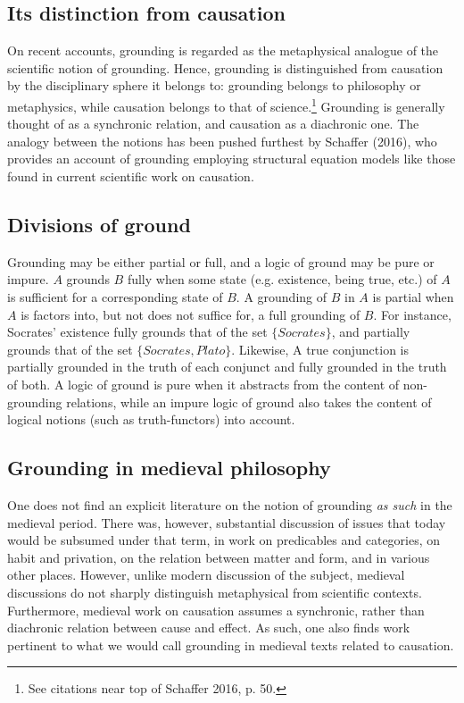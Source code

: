 \documentclass[a4paper,11pt]{article}
\begin{document}
\subsection{Its distinction from causation}
On recent accounts, grounding is regarded as the metaphysical analogue of the scientific notion of grounding. Hence, grounding is distinguished from causation by the disciplinary sphere it belongs to: grounding belongs to philosophy or metaphysics, while causation belongs to that of science.\footnote{See citations near top of Schaffer 2016, p. 50.} Grounding is generally thought of as a synchronic relation, and causation as a diachronic one. The analogy between the notions has been pushed furthest by Schaffer (2016), who provides an account of grounding employing structural equation models like those found in current scientific work on causation.
\subsection{Divisions of ground}
Grounding may be either partial or full, and a logic of ground may be pure or impure. $A$ grounds $B$ fully when some state (e.g. existence, being true, etc.) of $A$ is sufficient for a corresponding state of $B$. A grounding of $B$ in $A$ is partial when $A$ is factors into, but not does not suffice for, a full grounding of $B$. For instance, Socrates' existence fully grounds that of the set $\{Socrates\}$, and partially grounds that of the set $\{Socrates, Plato\}$. Likewise, A true conjunction is partially grounded in the truth of each conjunct and fully grounded in the truth of both. A logic of ground is pure when it abstracts from the content of non-grounding relations, while an impure logic of ground also takes the content of logical notions (such as truth-functors) into account.

\subsection{Grounding in medieval philosophy}
One does not find an explicit literature on the notion of grounding \textit{as such} in the medieval period. There was, however, substantial discussion of issues that today would be subsumed under that term, in work on predicables and categories, on habit and privation, on the relation between matter and form, and in various other places. However, unlike modern discussion of the subject, medieval discussions do not sharply distinguish metaphysical from scientific contexts. Furthermore, medieval work on causation assumes a synchronic, rather than diachronic relation between cause and effect. As such, one also finds work pertinent to what we would call grounding in medieval texts related to causation.
\end{document}
